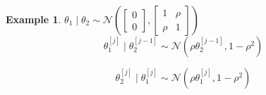 \documentclass[lecture,12pt,]{pcms-l}
\numberwithin{section}{chapter}
\numberwithin{equation}{chapter}
\theoremstyle{plain}
\theoremstyle{definition}
\newtheorem{example}{Example}[section]
\theoremstyle{definition}
\begin{document}
\begin{example}
$\theta_1 \mid \theta_2 \sim \mathcal{N}(\begin{bmatrix}
0\\ 
0
\end{bmatrix}, \begin{bmatrix}
1 & \rho\\ 
 \rho & 1
\end{bmatrix})$
\begin{equation}
\theta^{\left [ j \right ]}_1 \mid \theta^{\left [ j-1 \right ]}_2 \sim \mathcal{N}(\rho \theta^{\left [ j-1 \right ]}_2, 1-\rho^2)
\end{equation}

\begin{equation}
\theta^{\left [ j \right ]}_2 \mid \theta^{\left [ j \right ]}_1 \sim \mathcal{N}(\rho \theta^{\left [ j \right ]}_1, 1-\rho^2)
\end{equation}
\end{example}
\end{document}
